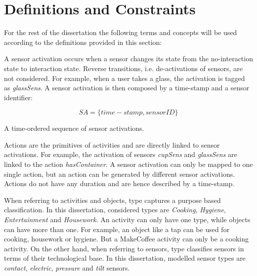 \section{Definitions and Constraints}
\label{sec:approach:def}

For the rest of the dissertation the following terms and concepts will be used according to the definitions provided in this section:

\begin{defn}
\label{def-sa}
 A sensor activation occurs when a sensor changes its state from the no-interaction state to interaction state. Reverse transitions, i.e. de-activations of sensors, are not considered. For example, when a user takes a glass, the activation is tagged as \textit{glassSens}. A sensor activation is then composed by a time-stamp and a sensor identifier:
 
 \begin{equation}
  SA = \{ time-stamp, sensorID \}
 \end{equation}

\end{defn}

\begin{defn}
\label{def-sa-dataset}
 A time-ordered sequence of sensor activations.
\end{defn}

\begin{defn}[Actions]
\label{def-action}
 Actions are the primitives of activities and are directly linked to sensor activations. For example, the activation of sensors \textit{cupSens} and \textit{glassSens} are linked to the action \textit{hasContainer}. A sensor activation can only be mapped to one single action, but an action can be generated by different sensor activations. Actions do not have any duration and are hence described by a time-stamp.
\end{defn}

\begin{defn}[Type]
\label{def-type}
 When referring to activities and objects, type captures a purpose based classification. In this dissertation, considered types are \textit{Cooking}, \textit{Hygiene}, \textit{Entertainment} and \textit{Housework}. An activity can only have one type, while objects can have more than one. For example, an object like a tap can be used for cooking, housework or hygiene. But a MakeCoffee activity can only be a cooking activity. On the other hand, when referring to sensors, type classifies sensors in terms of their technological base. In this dissertation, modelled sensor types are \textit{contact}, \textit{electric}, \textit{pressure} and \textit{tilt} sensors. 
\end{defn}

